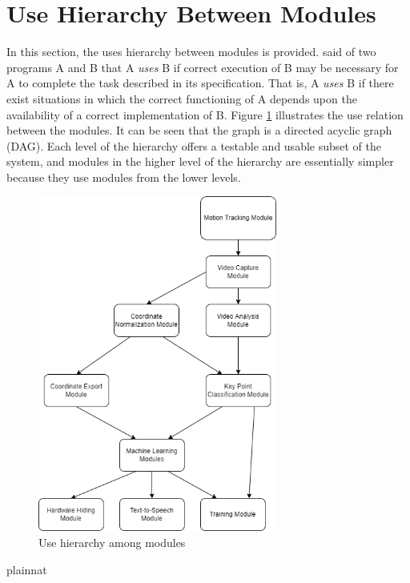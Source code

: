 \documentclass[12pt, titlepage]{article}
\begin{document}
\section{Use Hierarchy Between Modules} \label{SecUse}

In this section, the uses hierarchy between modules is
provided. \citet{Parnas1978} said of two programs A and B that A {\em uses} B if
correct execution of B may be necessary for A to complete the task described in
its specification. That is, A {\em uses} B if there exist situations in which
the correct functioning of A depends upon the availability of a correct
implementation of B.  Figure \ref{FigUH} illustrates the use relation between
the modules. It can be seen that the graph is a directed acyclic graph
(DAG). Each level of the hierarchy offers a testable and usable subset of the
system, and modules in the higher level of the hierarchy are essentially simpler
because they use modules from the lower levels.

\begin{figure}[H]
\centering
\includegraphics[width=0.7\textwidth]{Hierarchy.jpg}
\caption{Use hierarchy among modules}
\label{FigUH}
\end{figure}


 {plainnat}

\end{document}

